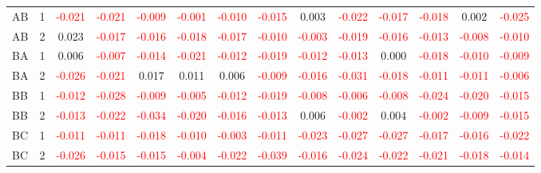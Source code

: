 \begin{table}[H]
{\begin{tabular}{llcccccccccccc}
AB & 1 & \textcolor{red}{-0.021} & \textcolor{red}{-0.021} & \textcolor{red}{-0.009} & \textcolor{red}{-0.001} & \textcolor{red}{-0.010} & \textcolor{red}{-0.015} & 0.003 & \textcolor{red}{-0.022} & \textcolor{red}{-0.017} & \textcolor{red}{-0.018} & 0.002 & \textcolor{red}{-0.025}\\
AB & 2 & 0.023 & \textcolor{red}{-0.017} & \textcolor{red}{-0.016} & \textcolor{red}{-0.018} & \textcolor{red}{-0.017} & \textcolor{red}{-0.010} & \textcolor{red}{-0.003} & \textcolor{red}{-0.019} & \textcolor{red}{-0.016} & \textcolor{red}{-0.013} & \textcolor{red}{-0.008} & \textcolor{red}{-0.010}\\
BA & 1 & 0.006 & \textcolor{red}{-0.007} & \textcolor{red}{-0.014} & \textcolor{red}{-0.021} & \textcolor{red}{-0.012} & \textcolor{red}{-0.019} & \textcolor{red}{-0.012} & \textcolor{red}{-0.013} & 0.000 & \textcolor{red}{-0.018} & \textcolor{red}{-0.010} & \textcolor{red}{-0.009}\\
BA & 2 & \textcolor{red}{-0.026} & \textcolor{red}{-0.021} & 0.017 & 0.011 & 0.006 & \textcolor{red}{-0.009} & \textcolor{red}{-0.016} & \textcolor{red}{-0.031} & \textcolor{red}{-0.018} & \textcolor{red}{-0.011} & \textcolor{red}{-0.011} & \textcolor{red}{-0.006}\\
BB & 1 & \textcolor{red}{-0.012} & \textcolor{red}{-0.028} & \textcolor{red}{-0.009} & \textcolor{red}{-0.005} & \textcolor{red}{-0.012} & \textcolor{red}{-0.019} & \textcolor{red}{-0.008} & \textcolor{red}{-0.006} & \textcolor{red}{-0.008} & \textcolor{red}{-0.024} & \textcolor{red}{-0.020} & \textcolor{red}{-0.015}\\
BB & 2 & \textcolor{red}{-0.013} & \textcolor{red}{-0.022} & \textcolor{red}{-0.034} & \textcolor{red}{-0.020} & \textcolor{red}{-0.016} & \textcolor{red}{-0.013} & 0.006 & \textcolor{red}{-0.002} & 0.004 & \textcolor{red}{-0.002} & \textcolor{red}{-0.009} & \textcolor{red}{-0.015}\\
BC & 1 & \textcolor{red}{-0.011} & \textcolor{red}{-0.011} & \textcolor{red}{-0.018} & \textcolor{red}{-0.010} & \textcolor{red}{-0.003} & \textcolor{red}{-0.011} & \textcolor{red}{-0.023} & \textcolor{red}{-0.027} & \textcolor{red}{-0.027} & \textcolor{red}{-0.017} & \textcolor{red}{-0.016} & \textcolor{red}{-0.022}\\
BC & 2 & \textcolor{red}{-0.026} & \textcolor{red}{-0.015} & \textcolor{red}{-0.015} & \textcolor{red}{-0.004} & \textcolor{red}{-0.022} & \textcolor{red}{-0.039} & \textcolor{red}{-0.016} & \textcolor{red}{-0.024} & \textcolor{red}{-0.022} & \textcolor{red}{-0.021} & \textcolor{red}{-0.018} & \textcolor{red}{-0.014}\\

\end{tabular}}
\end{table}
